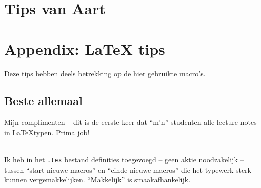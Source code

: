 \documentclass{2wa40summary}
\begin{document}
	    
		\newpage
		\section{Tips van Aart}			
		
		
		
		
		\newpage
		
		\appendix
		\section{Appendix: LaTeX tips}
		
		\opm Deze tips hebben deels betrekking op de hier gebruikte macro's.
		
		\subsection{Beste allemaal}
		
		Mijn complimenten -- dit is de eerste keer dat ``m'n'' studenten alle lecture notes in \LaTeX typen.
		Prima job!
		
		\ \\
		Ik heb in het \verb$.tex$ bestand definities toegevoegd -- geen aktie noodzakelijk -- tussen
		``start nieuwe macros'' en ``einde nieuwe macros'' die het
		typewerk sterk kunnen vergemakkelijken. ``Makkelijk'' is smaakafhankelijk.
		
\end{document}
